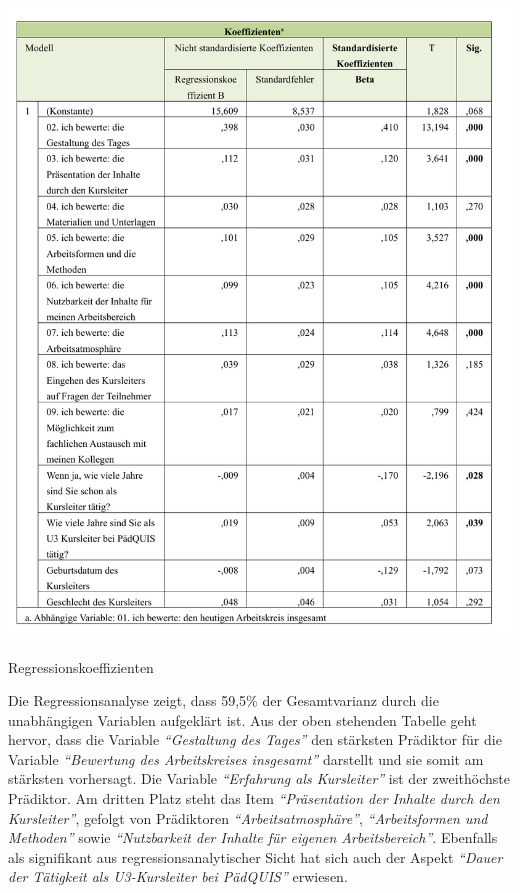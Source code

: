 \documentclass[12pt,a4paper]{article}
\begin{document}
\begin{table}[!ht]
\includegraphics[scale=0.8]{tab08.pdf}
\caption{Regressionskoeffizienten}
\label{tab.4}
\end{table}
\FloatBarrier

Die Regressionsanalyse zeigt, dass 59,5\% der Gesamtvarianz durch die unabhängigen Variablen aufgeklärt ist. Aus der oben stehenden Tabelle geht hervor, dass die Variable \textit{"`Gestaltung des Tages"'} den stärksten Prädiktor für die Variable \textit{"`Bewertung des Arbeitskreises insgesamt"'} darstellt und sie somit am stärksten vorhersagt. Die Variable \textit{"`Erfahrung als Kursleiter"'} ist der zweithöchste Prädiktor. Am dritten Platz steht das Item \textit{"`Präsentation der Inhalte durch den Kursleiter"'}, gefolgt von Prädiktoren \textit{"`Arbeitsatmosphäre"'},  \textit{"`Arbeitsformen und Methoden"'} sowie \textit{"`Nutzbarkeit der Inhalte für eigenen Arbeitsbereich"'}. Ebenfalls als signifikant aus regressionsanalytischer Sicht hat sich auch der Aspekt \textit{"`Dauer der Tätigkeit als U3-Kursleiter bei PädQUIS"'} erwiesen. 
\end{document}
